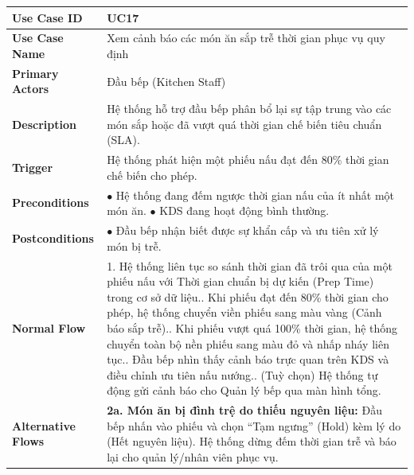 \begin{longtable}{|p{3.5cm}|p{12.5cm}|}
\hline
\textbf{Use Case ID} & UC17 \\ \hline
\textbf{Use Case Name} & Xem cảnh báo các món ăn sắp trễ thời gian phục vụ quy định \\ \hline
\textbf{Primary Actors} & Đầu bếp (Kitchen Staff) \\ \hline
\textbf{Description} & Hệ thống hỗ trợ đầu bếp phân bổ lại sự tập trung vào các món sắp hoặc đã vượt quá thời gian chế biến tiêu chuẩn (SLA). \\ \hline
\textbf{Trigger} & Hệ thống phát hiện một phiếu nấu đạt đến 80\% thời gian chế biến cho phép. \\ \hline
\textbf{Preconditions} &
$\bullet$ Hệ thống đang đếm ngược thời gian nấu của ít nhất một món ăn.\newline
$\bullet$ KDS đang hoạt động bình thường. \\ \hline
\textbf{Postconditions} & $\bullet$ Đầu bếp nhận biết được sự khẩn cấp và ưu tiên xử lý món bị trễ. \\ \hline
\textbf{Normal Flow} &
1. Hệ thống liên tục so sánh thời gian đã trôi qua của một phiếu nấu với Thời gian chuẩn bị dự kiến (Prep Time) trong cơ sở dữ liệu.\newline
2. Khi phiếu đạt đến 80\% thời gian cho phép, hệ thống chuyển viền phiếu sang màu vàng (Cảnh báo sắp trễ).\newline
3. Khi phiếu vượt quá 100\% thời gian, hệ thống chuyển toàn bộ nền phiếu sang màu đỏ và nhấp nháy liên tục.\newline
4. Đầu bếp nhìn thấy cảnh báo trực quan trên KDS và điều chỉnh ưu tiên nấu nướng.\newline
5. (Tuỳ chọn) Hệ thống tự động gửi cảnh báo cho Quản lý bếp qua màn hình tổng. \\ \hline
\textbf{Alternative Flows} &
\textbf{2a. Món ăn bị đình trệ do thiếu nguyên liệu:} Đầu bếp nhấn vào phiếu và chọn ``Tạm ngưng'' (Hold) kèm lý do (Hết nguyên liệu). Hệ thống dừng đếm thời gian trễ và báo lại cho quản lý/nhân viên phục vụ. \\ \hline
\end{longtable}

